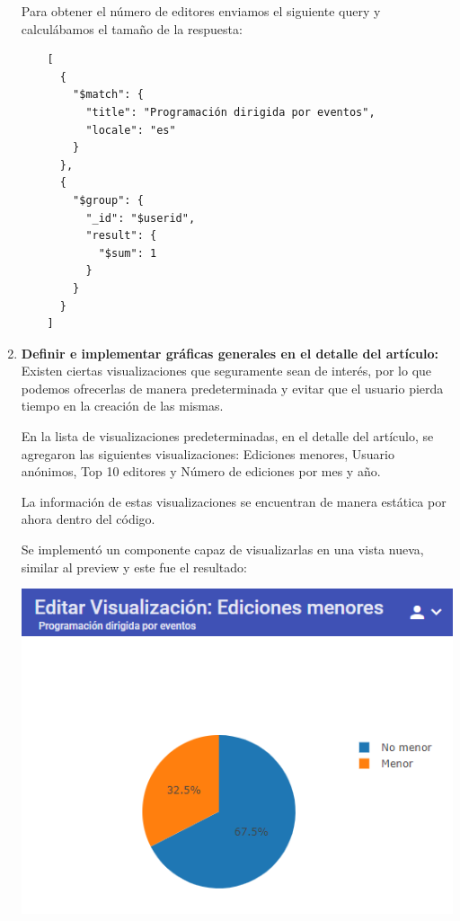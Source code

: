 \begin{enumerate}
  Para obtener el número de editores enviamos el siguiente query y calculábamos el tamaño de la respuesta:
  \begin{verbatim}
    [
      {
        "$match": {
          "title": "Programación dirigida por eventos",
          "locale": "es"
        }
      },
      {
        "$group": {
          "_id": "$userid",
          "result": {
            "$sum": 1
          }
        }
      }
    ]
  \end{verbatim}

  \item\textbf{Definir e implementar gráficas generales en el detalle del artículo:}\\
  
  Existen ciertas visualizaciones que seguramente sean de interés, por lo que podemos ofrecerlas de manera predeterminada y evitar que el usuario pierda tiempo en la creación de las mismas.
  
  En la lista de visualizaciones predeterminadas, en el detalle del artículo, se agregaron las siguientes visualizaciones: Ediciones menores, Usuario anónimos, Top 10 editores y Número de ediciones por mes y año.
  
  La información de estas visualizaciones se encuentran de manera estática por ahora dentro del código.
  
  Se implementó un componente capaz de visualizarlas en una vista nueva, similar al preview y este fue el resultado:
  
  \begin{center}
    \bigbreak
    \includegraphics[scale=0.7]{images/marco_aplicativo/vis_default_minor_edit.png}
    \bigbreak
  \end{center}
  

\end{enumerate}
